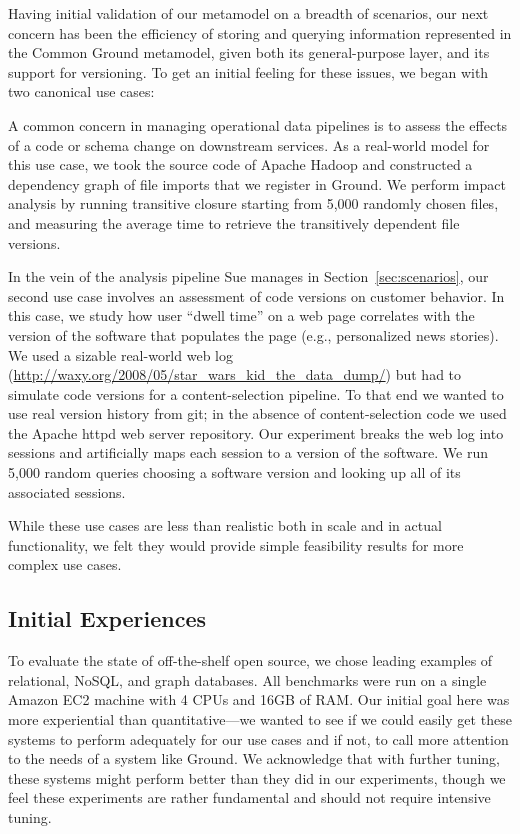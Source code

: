 \documentclass{sig-alternate}
\begin{document}
Having initial validation of our metamodel on a breadth of scenarios, our next concern has been the efficiency of storing and querying information represented in the Common Ground metamodel, given both its general-purpose \modelgraph layer, and its support for versioning. To get an initial feeling for these issues, we began with two canonical use cases:

 A common concern in managing operational data pipelines is to assess the effects of a code or schema change on downstream services.
As a real-world model for this use case, we took the source code of Apache Hadoop and constructed a dependency graph of file imports that we register in Ground.
We perform impact analysis by running transitive closure starting from 5,000 randomly chosen files, and measuring the average time to retrieve the transitively dependent file versions.

 In the vein of the analysis pipeline Sue manages in Section~\ref{sec:scenarios}, our second use case involves an assessment of code versions on customer behavior. 
In this case, we study how user ``dwell time'' on a web page correlates with the version of the software that populates the page (e.g., personalized news stories). 
We used a sizable real-world web log ({\small \url{http://waxy.org/2008/05/star_wars_kid_the_data_dump/}}) %
but had to simulate code versions for a content-selection pipeline. 
To that end we wanted to use real version history from git; in the absence of content-selection code we used the Apache httpd web server repository. 
Our experiment breaks the web log into sessions and artificially maps each session to a version of the software.
We run 5,000 random queries choosing a software version and looking up all of its associated sessions.
\smallitembot

While these use cases are less than realistic both in scale and in actual functionality, we felt they would provide simple feasibility results for more complex use cases.

\subsection{Initial Experiences}
\label{sec:perf}
To evaluate the state of off-the-shelf open source, we chose leading examples of relational, NoSQL, and graph databases.
All benchmarks were run on a single Amazon EC2  machine with 4 CPUs and 16GB of RAM. 
Our initial goal here was more experiential than quantitative---we wanted to see if we could easily get these systems to perform adequately for our use cases and if not, to call more attention to the needs of a system like Ground.
We acknowledge that with further tuning, these systems might perform better than they did in our experiments, though we feel these experiments are rather fundamental and should not require intensive tuning.
\end{document}
